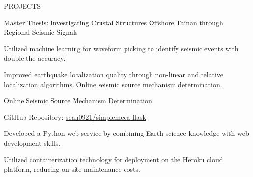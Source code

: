 \documentclass{resume} %
\begin{document}
\begin{rSection}{PROJECTS}


\begin{rSubsection}{Master Thesis: Investigating Crustal Structures Offshore Tainan through Regional Seismic Signals}{}{}{}
\item Utilized machine learning for waveform picking to identify seismic events with double the accuracy.
\item Improved earthquake localization quality through non-linear and relative localization algorithms. Online seismic source mechanism determination.
\end{rSubsection}
\begin{rSubsection}{Online Seismic Source Mechanism Determination}{}{}{}
\item GitHub Repository: \href{https://github.com/sean0921/simplemeca-flask}{sean0921/simplemeca-flask}
\item Developed a Python web service by combining Earth science knowledge with web development skills.
\item Utilized containerization technology for deployment on the Heroku cloud platform, reducing on-site maintenance costs.
\end{rSubsection}
\end{rSection}

\end{document}
